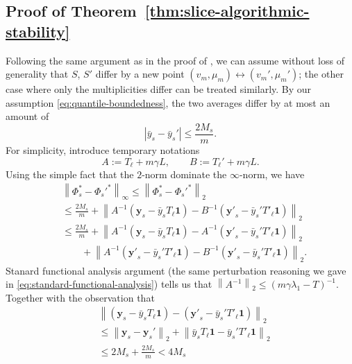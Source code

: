 \documentclass[letterpaper]{article} %
\begin{document}
	\subsection{Proof of Theorem~\ref{thm:slice-algorithmic-stability}}
	Following the same argument as in the proof of \cite[Theorem 5]{Belkin2004}, we can assume without loss of generality that $S$, $S'$ differ by a new point $\left( v_m,\mu_m \right)\leftrightarrow \left( v_m',\mu_m' \right)$; the other case where only the multiplicities differ can be treated similarly. By our assumption \eqref{eq:quantile-boundedness}, the two averages differ by at most an amount of
	\begin{equation*}
	\left| \bar{y}_s-\bar{y}_s' \right|\leq \frac{2M_s}{m}.
	\end{equation*}
	For simplicity, introduce temporary notations
	\begin{equation*}
	A:=T_{\ell}+m\gamma L,\qquad B:=T_{\ell}'+m\gamma L.
	\end{equation*}
	Using the simple fact that the $2$-norm dominate the $\infty$-norm, we have
	\begin{equation*}
	\begin{aligned}
	&\left\| \Phi_s^{*} -\Phi_s'^{*} \right\|_{\infty} \leq \left\| \Phi_s^{*} -\Phi_s'^{*} \right\|_2\\
	&\leq \frac{2M_s}{m}+\left\| A^{-1}\left(\mathbf{y}_s-\bar{y}_sT_\ell\mathbf{1}\right)-B^{-1}\left(\mathbf{y'}_s-\bar{y}_s'T'_\ell\mathbf{1}\right) \right\|_2\\
	&\leq \frac{2M_s}{m}+\left\| A^{-1}\left(\mathbf{y}_s-\bar{y}_sT_\ell\mathbf{1}\right)-A^{-1}\left(\mathbf{y'}_s-\bar{y}_s'T'_\ell\mathbf{1}\right) \right\|_2\\
	&\qquad+\left\| A^{-1}\left(\mathbf{y'}_s-\bar{y}_s'T'_\ell\mathbf{1}\right)-B^{-1}\left(\mathbf{y'}_s-\bar{y}_s'T'_\ell\mathbf{1}\right) \right\|_2.
	\end{aligned}
	\end{equation*}
	Stanard functional analysis argument (the same perturbation reasoning we gave in \eqref{eq:standard-functional-analysis}) tells us that $\left\| A^{-1} \right\|_2\leq \left( m\gamma\lambda_1-T \right)^{-1}$. Together with the observation that
	\begin{align*}
	&\left\| \left(\mathbf{y}_s-\bar{y}_sT_\ell\mathbf{1}\right) - \left(\mathbf{y'}_s-\bar{y}_s'T'_\ell\mathbf{1}\right) \right\|_2\\
	&\leq \left\| \mathbf{y}_s-\mathbf{y}_s' \right\|_2+\left\| \bar{y}_sT_\ell\mathbf{1}-\bar{y}_s'T'_\ell\mathbf{1} \right\|_2\\
	&\leq 2M_s+\frac{2M_s}{m}<4M_s
	\end{align*}
\end{document}
